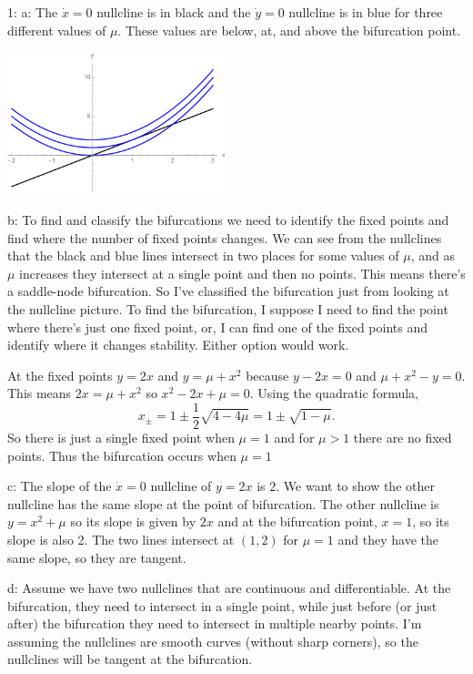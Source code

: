 \documentclass[12pt,letterpaper,noanswers]{exam}
\begin{document}
\eject

1: a: The $\dot{x} = 0$ nullcline is in black and the $\dot{y} = 0$ nullcline is in blue for three different values of $\mu$.  These values
are below, at, and above the bifurcation point.


\includegraphics[width=2.5in]{img/C15nullclines.pdf}


b: To find and classify the bifurcations we need to identify the fixed points and find where the number of fixed points changes.
We can see from the nullclines that the black and blue lines intersect in two places for some values of $\mu$, and as $\mu$ increases
they intersect at a single point and then no points.  This means there's a saddle-node bifurcation.  So I've classified the bifurcation just
from looking at the nullcline picture.  To find the bifurcation, I suppose I need to find the point where there's just one fixed point, or, I can
find one of the fixed points and identify where it changes stability.  Either option would work.

At the fixed points $y = 2x$ and $y = \mu + x^2$ because $y-2x = 0$ and $\mu + x^2 - y = 0$.
This means $2x = \mu + x^2$ so $x^2 - 2x + \mu = 0$.  Using the quadratic formula,
\[x_\pm = 1 \pm \frac{1}{2} \sqrt{4 - 4\mu} = 1\pm \sqrt{1 - \mu}.\]
So there is just a single fixed point when $\mu = 1$ and for $\mu >1$ there are no fixed points.  Thus the bifurcation occurs
when $\mu = 1$ %

c: The slope of the $\dot{x} = 0$ nullcline of $y = 2x$ is $2$.  We want to show the other nullcline has the same slope at the point
of bifurcation.  The other nullcline is $y = x^2 + \mu$ so its slope is given by $2x$ and at the bifurcation point, $x = 1$, so its slope is also 2.
The two lines intersect at $(1,2)$ for $\mu = 1$ and they have the same slope, so they are tangent.

d: Assume we have two nullclines that are continuous and differentiable.  At the bifurcation, they need to intersect in a single point, while just before (or just after) the bifurcation they need to intersect in multiple nearby points.  I'm assuming the nullclines are smooth curves (without sharp corners), so the nullclines will be tangent at the bifurcation.
\end{document}
